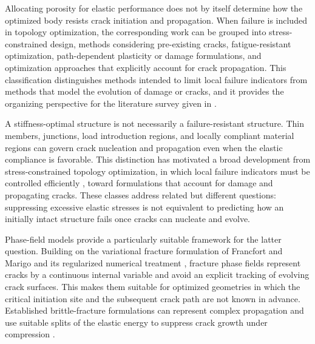 \documentclass[
	pdflatex,
	sn-mathphys-num
]{sn-jnl}
\theoremstyle{thmstyleone}%
\theoremstyle{thmstyletwo}%
\theoremstyle{thmstylethree}%
\begin{document}
Allocating porosity for elastic performance does not
by itself determine how the optimized body resists crack
initiation and propagation.
When failure is included in topology optimization, the
corresponding work can be grouped into stress-constrained
design, methods considering pre-existing cracks,
fatigue-resistant optimization, path-dependent plasticity or
damage formulations, and optimization approaches that
explicitly account for crack propagation. This classification
distinguishes methods intended to limit local failure
indicators from methods that model the evolution of damage or
cracks, and it provides the organizing perspective for the
literature survey given in \cite{yvonnet_topology_2024}.

A stiffness-optimal structure is not necessarily a
failure-resistant structure. Thin members, junctions, load
introduction regions, and locally compliant material regions can
govern crack nucleation and propagation even when the elastic
compliance is favorable. This distinction has motivated a broad
development from stress-constrained topology optimization, in
which local failure indicators must be controlled efficiently
\cite{verbart_damage_2016}, toward formulations that account
for damage and propagating cracks. These classes address related
but different questions: suppressing excessive elastic stresses
is not equivalent to predicting how an initially intact
structure fails once cracks can nucleate and evolve.

Phase-field models provide a particularly suitable framework
for the latter question. Building on the variational fracture
formulation of Francfort and Marigo
\cite{francfort_revisiting_1998} and its regularized numerical
treatment \cite{bourdin_numerical_2000,bourdin_variational_2008},
fracture phase fields represent cracks by a continuous internal
variable and avoid an explicit tracking of evolving crack
surfaces. This makes them suitable for optimized geometries in
which the critical initiation site and the subsequent crack path
are not known in advance. Established brittle-fracture
formulations can represent complex propagation and use suitable
splits of the elastic energy to suppress crack growth under
compression
\cite{kuhn_continuum_2010,miehe_phase_2010,ambati_review_2015,strobl_constitutive_2016,swamynathan_energetically_2021,vicentini_energy_2024}.
\end{document}
